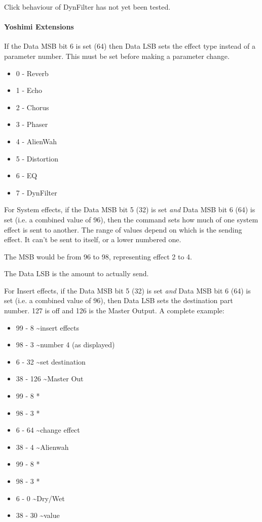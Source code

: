    Click behaviour of DynFilter has not yet been tested.

\paragraph{Yoshimi Extensions}

   If the Data MSB bit 6 is set (64) then Data LSB sets the effect type
   instead of a parameter number.  This must be set before making a parameter
   change.

   \begin{itemize}
      \item 0 - Reverb
      \item 1 - Echo
      \item 2 - Chorus
      \item 3 - Phaser
      \item 4 - AlienWah
      \item 5 - Distortion
      \item 6 - EQ
      \item 7 - DynFilter
   \end{itemize}


   For System effects, if the Data MSB bit 5 (32) is set
   \textsl{and} Data MSB bit 6 (64) is set (i.e. a combined value of 96),
   then the command sets how much of one system effect is sent to another.
   The range of values depend on which is the sending effect. It can't be
   sent to itself, or a lower numbered one.

   The MSB would be from 96 to 98, representing effect 2 to 4.

   The Data LSB is the amount to actually send.

   For Insert effects, if the Data MSB bit 5 (32) is set
   \textsl{and} Data MSB bit 6 (64) is set (i.e. a combined value of 96),
   then Data LSB sets the destination part number.
   127 is off and 126 is the Master Output.
   A complete example:

   \begin{itemize}
      \item 99 -   8 \textasciitilde insert effects
      \item 98 -   3 \textasciitilde number 4 (as displayed)
      \item 6 -  32 \textasciitilde set destination
      \item 38 - 126 \textasciitilde Master Out
      \item 99 -   8  *
      \item 98 -   3  *
      \item 6 -  64 \textasciitilde change effect
      \item 38 -   4 \textasciitilde Alienwah
      \item 99 -   8  *
      \item 98 -   3  *
      \item 6 -   0 \textasciitilde Dry/Wet
      \item 38 -  30 \textasciitilde value
   \end{itemize}

